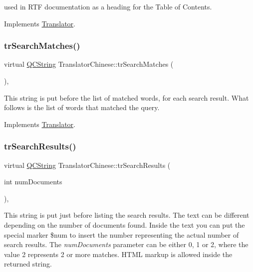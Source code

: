 used in R\+TF documentation as a heading for the Table of Contents. 

Implements \mbox{\hyperlink{class_translator}{Translator}}.

\mbox{\label{class_translator_chinese_a29ca693833cf41be5cfcbc0f3711ff65}} 
\subsubsection{\texorpdfstring{trSearchMatches()}{trSearchMatches()}}
{\footnotesize\ttfamily virtual \mbox{\hyperlink{class_q_c_string}{Q\+C\+String}} Translator\+Chinese\+::tr\+Search\+Matches (\begin{DoxyParamCaption}{ }\end{DoxyParamCaption})\hspace{0.3cm}{\ttfamily [inline]}, {\ttfamily [virtual]}}

This string is put before the list of matched words, for each search result. What follows is the list of words that matched the query. 

Implements \mbox{\hyperlink{class_translator}{Translator}}.

\mbox{\label{class_translator_chinese_ac6f51e7506b05f8f1622b4070a992545}} 
\subsubsection{\texorpdfstring{trSearchResults()}{trSearchResults()}}
{\footnotesize\ttfamily virtual \mbox{\hyperlink{class_q_c_string}{Q\+C\+String}} Translator\+Chinese\+::tr\+Search\+Results (\begin{DoxyParamCaption}\item[{int}]{num\+Documents }\end{DoxyParamCaption})\hspace{0.3cm}{\ttfamily [inline]}, {\ttfamily [virtual]}}

This string is put just before listing the search results. The text can be different depending on the number of documents found. Inside the text you can put the special marker \$num to insert the number representing the actual number of search results. The {\itshape num\+Documents} parameter can be either 0, 1 or 2, where the value 2 represents 2 or more matches. H\+T\+ML markup is allowed inside the returned string. 

